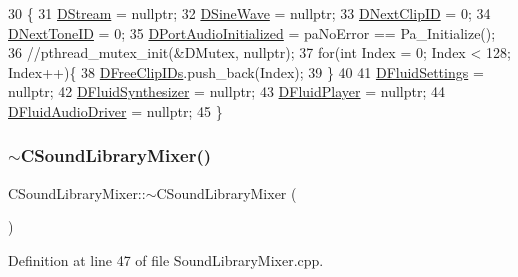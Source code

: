 \begin{DoxyCode}
30                                       \{
31     \hyperlink{classCSoundLibraryMixer_ad992cd6202130db3a45ca695eca34625}{DStream} = \textcolor{keyword}{nullptr};
32     \hyperlink{classCSoundLibraryMixer_a7d696c93362c862bfc651a28ee8f67cf}{DSineWave} = \textcolor{keyword}{nullptr};
33     \hyperlink{classCSoundLibraryMixer_a9bbd8e4d0945a06cdb3b21aa05ddeb60}{DNextClipID} = 0;
34     \hyperlink{classCSoundLibraryMixer_a88efc1ea710744bceadccf66967f9736}{DNextToneID} = 0;
35     \hyperlink{classCSoundLibraryMixer_a1c78419f5e6cfdf4bc879bb5eedf52f0}{DPortAudioInitialized} = paNoError == Pa\_Initialize();
36     \textcolor{comment}{//pthread\_mutex\_init(&DMutex, nullptr);}
37     \textcolor{keywordflow}{for}(\textcolor{keywordtype}{int} Index = 0; Index < 128; Index++)\{
38         \hyperlink{classCSoundLibraryMixer_a32956ae09580a1ae4c9c037f0f7b5c0b}{DFreeClipIDs}.push\_back(Index);   
39     \}
40     
41     \hyperlink{classCSoundLibraryMixer_a2c6fb394c8bed99adb019576dc7f6eee}{DFluidSettings} = \textcolor{keyword}{nullptr};
42     \hyperlink{classCSoundLibraryMixer_a6c1663c381dbf2aa18c82a23141f409c}{DFluidSynthesizer} = \textcolor{keyword}{nullptr};
43     \hyperlink{classCSoundLibraryMixer_a6773ddf83ef86bc27598f6c5cee61d9c}{DFluidPlayer} = \textcolor{keyword}{nullptr};
44     \hyperlink{classCSoundLibraryMixer_a4ba4ccc9c6603c98a5432042e779977e}{DFluidAudioDriver} = \textcolor{keyword}{nullptr};
45 \}
\end{DoxyCode}
\hypertarget{classCSoundLibraryMixer_a73733f975356d1f21834d72503bc580f}{}\label{classCSoundLibraryMixer_a73733f975356d1f21834d72503bc580f} 
\subsubsection{\texorpdfstring{$\sim$\+C\+Sound\+Library\+Mixer()}{~CSoundLibraryMixer()}}
{\footnotesize\ttfamily C\+Sound\+Library\+Mixer\+::$\sim$\+C\+Sound\+Library\+Mixer (\begin{DoxyParamCaption}{ }\end{DoxyParamCaption})}



Definition at line 47 of file Sound\+Library\+Mixer.\+cpp.



